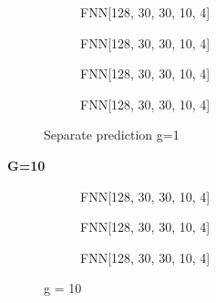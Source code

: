 \documentclass[a4paper,times,12pt]{article}
\begin{document}
\begin{figure}[H]
    \centering
    \begin{subfigure}[t]{0.45\textwidth}
		\centering
        
        \caption{FNN[128, 30, 30, 10, 4]}
		\label{fig:a}
    \end{subfigure}\hfill
    \begin{subfigure}[t]{0.45\textwidth}
		\centering
        
        \caption{FNN[128, 30, 30, 10, 4]}
		\label{fig:b}
    \end{subfigure}\hfill    
    \begin{subfigure}[t]{0.45\textwidth}
        \centering
        
        \caption{FNN[128, 30, 30, 10, 4]}
		\label{fig:c}
    \end{subfigure}\hfill
    \begin{subfigure}[t]{0.45\textwidth}
        \centering
        
        \caption{FNN[128, 30, 30, 10, 4]}
		\label{fig:c}
    \end{subfigure}
	\caption{Separate prediction  g=1}
\end{figure}

\textbf{G=10}

\begin{figure}[H]
    \centering
    \begin{subfigure}[t]{0.45\textwidth}
		\centering
        
        \caption{FNN[128, 30, 30, 10, 4]}
		\label{fig:a}
    \end{subfigure}\hfill
    \begin{subfigure}[t]{0.45\textwidth}
		\centering
        
        \caption{FNN[128, 30, 30, 10, 4]}
		\label{fig:b}
    \end{subfigure}\hfill    
    \begin{subfigure}[t]{0.45\textwidth}
        \centering
        
        \caption{FNN[128, 30, 30, 10, 4]}
		\label{fig:c}
    \end{subfigure}
	\caption{g = 10}
\end{figure}
\end{document}
